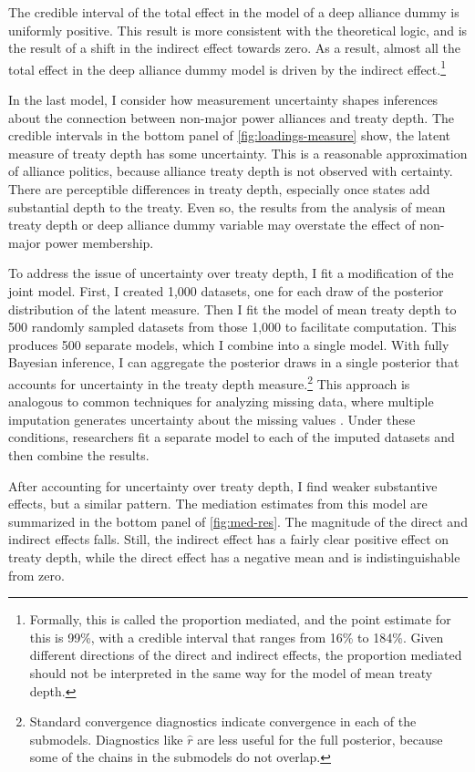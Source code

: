 \documentclass[12pt]{article}
\begin{document}
The credible interval of the total effect in the model of a deep alliance dummy is uniformly positive. 
This result is more consistent with the theoretical logic, and is the result of a shift in the indirect effect towards zero. 
As a result, almost all the total effect in the deep alliance dummy model is driven by the indirect effect.\footnote{Formally, this is called the proportion mediated, and the point estimate for this is 99\%, with a credible interval that ranges from 16\% to 184\%. Given different directions of the direct and indirect effects, the proportion mediated should not be interpreted in the same way for the model of mean treaty depth.}


In the last model, I consider how measurement uncertainty shapes inferences about the connection between non-major power alliances and treaty depth. 
The credible intervals in the bottom panel of \autoref{fig:loadings-measure} show, the latent measure of treaty depth has some uncertainty. 
This is a reasonable approximation of alliance politics, because alliance treaty depth is not observed with certainty. 
There are perceptible differences in treaty depth, especially once states add substantial depth to the treaty. 
Even so, the results from the analysis of mean treaty depth or deep alliance dummy variable may overstate the effect of non-major power membership. 


To address the issue of uncertainty over treaty depth, I fit a modification of the joint model. 
First, I created 1,000 datasets, one for each draw of the posterior distribution of the latent measure.
Then I fit the model of mean treaty depth to 500 randomly sampled datasets from those 1,000 to facilitate computation. 
This produces 500 separate models, which I combine into a single model. 
With fully Bayesian inference, I can aggregate the posterior draws in a single posterior that accounts for uncertainty in the treaty depth measure.\footnote{Standard convergence diagnostics indicate convergence in each of the submodels. Diagnostics like $\hat{r}$ are less useful for the full posterior, because some of the chains in the submodels do not overlap.}
This approach is analogous to common techniques for analyzing missing data, where multiple imputation generates uncertainty about the missing values \citep{Hollenbachetal2018imp}.
Under these conditions, researchers fit a separate model to each of the imputed datasets and then combine the results. 


After accounting for uncertainty over treaty depth, I find weaker substantive effects, but a similar pattern. 
The mediation estimates from this model are summarized in the bottom panel of \autoref{fig:med-res}. 
The magnitude of the direct and indirect effects falls. 
Still, the indirect effect has a fairly clear positive effect on treaty depth, while the direct effect has a negative mean and is indistinguishable from zero. 
\end{document}
